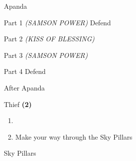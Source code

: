 \begin{paracol}{2}
\begin{boss}{Apanda}
    \varwb
    \begin{bossPart}{Part 1}
        \bartz[\bossHl{(1x)}] \rightCommand{\combine} \then \battleGroup{\revivify \space + \antidote} \textit{(SAMSON POWER)} \then {}
        \faris[\bossHl{(1x)}] \leftCommand{\drink} \then \speedDrink
         Defend
         \leftCommand{\guard}
    \end{bossPart}
    \begin{bossPart}{Part 2}
        \bartz[\bossHl{(1x)}] \rightCommand{\combine} \then \battleGroup{\revivify \space + \maidensKiss} \textit{(KISS OF BLESSING)} \then {}
    \end{bossPart}
    \begin{bossPart}{Part 3}
        \faris[\bossHl{(2x)}] \leftCommand{\drink} \then \heroDrink
        \bartz[\bossHl{(2x)}] \rightCommand{\combine} \then \battleGroup{\revivify \space + \antidote} \textit{(SAMSON POWER)} \then {}
    \end{bossPart}
    \begin{bossPart}{Part 4}
        \faris[\bossHl{(3x)}] \rightCommand{\gilToss}
         Defend
    \end{bossPart}
    \varwe
\end{boss}

\switchcolumnTwice[*]
\begin{menu}{After Apanda}
    \varwb
    \begin{jobMenu}
        \cara Thief \textbf{(2\pointRight)} \ability{!\gilToss}
    \end{jobMenu}
    \varwe
\end{menu}

\newpage
\begin{enumerate}[resume]
    \item {}
    \item Make your way through the Sky Pillars
\end{enumerate}

\switchcolumn
\vspace{-1cm}
\begin{steproute}{Sky Pillars}
\end{steproute}

\end{paracol}